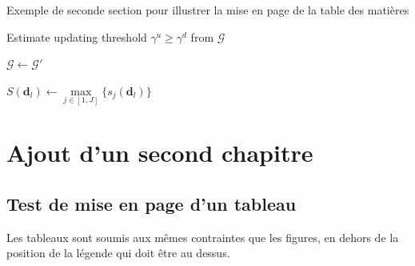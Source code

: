 \documentclass[letterpaper%
, twoside%
, 12pt%
,these%
,french
,creativecommons,hyperref,withAlgo2e%
]{thETS}
\begin{document}
Exemple de seconde section pour illustrer la mise en page de la table des matières

\begin{algorithm}[!h]

\caption{Exemple d'algorithme}

\BlankLine
\BlankLine

Estimate updating threshold $\gamma^u \geq \gamma^d$ from $\mathcal G$\;

$\mathcal G \leftarrow \mathcal G'$

	
	$S(\textbf{d}_l) \leftarrow \max\limits_{j \in [1,J]}\{s_j(\textbf{d}_l)\}$\;
	
\end{algorithm}

\chapter{Ajout d'un second chapitre}

\section{Test de mise en page d'un tableau}

Les tableaux sont soumis aux mêmes contraintes que les figures, en dehors de la position de la légende qui doit être au dessus.
\end{document}
